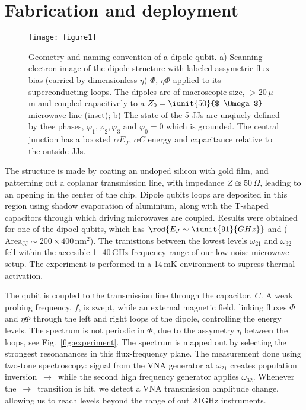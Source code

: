 \section{Fabrication and deployment}
 \begin{figure}[h!]
 	\texttt{[image: figure1]}
 	\caption{\small Geometry and naming convention of a dipole qubit. a) Scanning electron image of the dipole structure with labeled assymetric flux bias (carried by dimensionless $ \eta $) $ \Phi $, $ \eta\Phi $ applied to its superconducting loops. The dipoles are of macroscopic size, $ > 20\,\mu $m and coupled capacitively to a $ Z_0 = \iunit{50}{$ \Omega $} $ microwave line (inset); b) The state of the 5 JJs are unqiuely defined by thee phases, $ \varphi_{1}, \varphi_{2}, \varphi_{3}$ and $ \varphi_0 = 0$ which is grounded. The central junction has a boosted $ \alpha E_J $, $ \alpha C $ energy and capacitance relative to the outside JJs.}
 	\label{fig:setup}
 \end{figure}
 
 The structure is made by coating an undoped silicon with gold film, and patterning out a coplanar transmission line, with impedance $ Z \approxeq 50\,\Omega $, leading to an opening in the center of the chip. Dipole qubits loops are deposited in this region using shadow evaporation of aluminium, along with the T-shaped capacitors through which driving microwaves are coupled. Results were obtained for one of the dipoel qubits, which has $ \red{E_J\sim \iunit{91}{GHz}} $ and  ($ \text{Area}_\text{JJ} \sim 200\times 400\,\text{nm}^2$). The tranistions between the lowest levels $ \omega_{21} $ and $ \omega_{32} $ fell within the accesible 1\,-\,40\,GHz frequency range of our low-noise microwave setup. The experiment is performed in a 14\,mK environment to supress thermal activation.


 The qubit is coupled to the transmission line through the capacitor, $ C $. A weak probing frequency, $ f $, is swept, while an external magnetic field, linking fluxes $ \Phi $ and $ \eta\Phi $ through the left and right loops of the dipole, controlling the energy levels. The spectrum is not periodic in $ \Phi $, due to the assymetry $ \eta $ between the loops, see Fig.~\ref{fig:experiment}. The spectrum is mapped out by selecting the strongest resonanances in this flux-frequency plane. The measurement done using two-tone spectroscopy: signal from the VNA generator at $ \omega_{21} $ creates population inversion $ \,\rightarrow\,$ while the second high frequency generator applies $ \omega_{32} $. Whenever the $ \,\rightarrow\,$ transition is hit, we detect a VNA transmission amplitude change, allowing us to reach levels beyond the range of out 20\,GHz instruments. 
 
